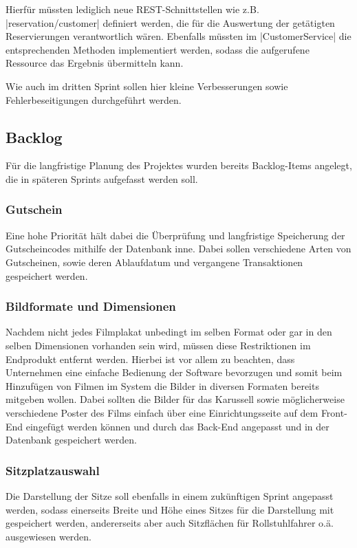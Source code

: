 Hierfür müssten lediglich neue \acs{REST}-Schnittstellen wie z.B. \jinline|reservation/customer| definiert werden, die für die Auswertung der getätigten Reservierungen verantwortlich wären.
Ebenfalls müssten im \jinline|CustomerService| die entsprechenden Methoden implementiert werden, sodass die aufgerufene Ressource das Ergebnis übermitteln kann.

Wie auch im dritten Sprint sollen hier kleine Verbesserungen sowie Fehlerbeseitigungen durchgeführt werden.

\subsection{Backlog}
\label{ssec:backlog}
\multipleauthorsection{\authorRF}{\authorEJ, \authorNL}
Für die langfristige Planung des Projektes wurden bereits Backlog-Items angelegt, die in späteren Sprints aufgefasst werden soll.

\subsubsection*{Gutschein}
\label{ssssec:gutschein}
Eine hohe Priorität hält dabei die Überprüfung und langfristige Speicherung der Gutscheincodes mithilfe der Datenbank inne.
Dabei sollen verschiedene Arten von Gutscheinen, sowie deren Ablaufdatum und vergangene Transaktionen gespeichert werden.

\subsubsection*{Bildformate und Dimensionen}
\label{ssssec:bildformatedimensionen}
Nachdem nicht jedes Filmplakat unbedingt im selben Format oder gar in den selben Dimensionen vorhanden sein wird, müssen diese Restriktionen im Endprodukt entfernt werden.
Hierbei ist vor allem zu beachten, dass Unternehmen eine einfache Bedienung der Software bevorzugen und somit beim Hinzufügen von Filmen im System die Bilder in diversen Formaten bereits mitgeben wollen.
Dabei sollten die Bilder für das Karussell sowie möglicherweise verschiedene Poster des Films einfach über eine Einrichtungsseite auf dem Front-End eingefügt werden können und durch das Back-End angepasst und in der Datenbank gespeichert werden.

\subsubsection*{Sitzplatzauswahl}
\label{ssssec:sitzplatzauswahl}
Die Darstellung der Sitze soll ebenfalls in einem zukünftigen Sprint angepasst werden, sodass einerseits Breite und Höhe eines Sitzes für die Darstellung mit gespeichert werden, andererseits aber auch Sitzflächen für Rollstuhlfahrer o.ä. ausgewiesen werden.

